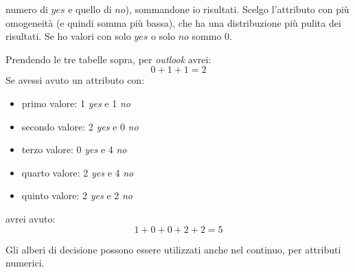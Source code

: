 \documentclass[a4paper,12pt, oneside]{book}
\begin{document}
numero di $yes$ e quello di $no$), sommandone io risultati. Scelgo
l'attributo con più omogeneità (e quindi somma più bassa), che ha una
distribuzione più pulita dei risultati. Se ho valori con solo
$yes$ o solo $no$ sommo 0.
\begin{esempio}
  Prendendo le tre tabelle sopra, per \textit{outlook} avrei:
  \[0+1+1=2\]
  Se avessi avuto un attributo con:
  \begin{itemize}
    \item primo valore: 1 \textit{yes} e 1 \textit{no}
    \item secondo valore: 2 \textit{yes} e 0 \textit{no}
    \item terzo valore: 0 \textit{yes} e 4 \textit{no}
    \item quarto valore: 2 \textit{yes} e 4 \textit{no}
    \item quinto valore: 2 \textit{yes} e 2 \textit{no} 
  \end{itemize}
  avrei avuto:
  \[1+0+0+2+2=5\]
\end{esempio}
Gli alberi di decisione possono essere utilizzati anche nel continuo, per
attributi numerici.
\end{document}
